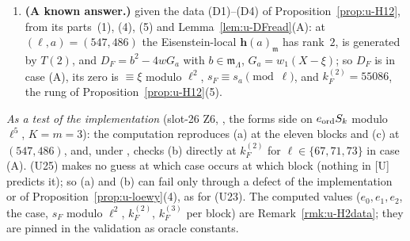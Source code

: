 \documentclass[11pt]{article}
\newcommand{\Iw}{\Lambda}                         %
\newcommand{\hcusp}{\mathbf{h}}                   %
\begin{document}
\begin{prediction}
\begin{enumerate}
  ramified discrete valuation ring.
\item[(c)] \textbf{(A known answer.)} \PROVED{} given the data (D1)--(D4) of Proposition~\ref{prop:u-H12}, from its
parts~(1), (4), (5) and Lemma~\ref{lem:u-DFread}(A): at $(\ell,a)=(547,486)$ the Eisenstein-local
  $\hcusp(a)_{\mathfrak m}$ has rank~$2$, is generated by $T(2)$, and $D_F=b^{2}-4wG_a$ with $b\in\mathfrak m_\Iw$, $G_a=w_1(X-\xi)$; so $D_F$ is in case (A), its zero is $\equiv\xi$
  modulo $\ell^{2}$, $s_F\equiv s_a\pmod\ell$, and $k^{(2)}_F=55086$, the rung of Proposition~\ref{prop:u-H12}(5).
\end{enumerate}
\emph{As a test of the implementation} (slot-26 Z6, , the forms side on $e_{\mathrm{ord}} S_k$ modulo $\ell^{5}$, $K=m=3$):
the computation reproduces (a) at the eleven blocks and (c) at $(547,486)$, and, under , checks (b) directly at $k^{(2)}_F$ for $\ell\in\{67,71,73\}$ in case (A).
(U25) makes no guess at which case occurs at which block (nothing in [U] predicts it); so (a) and (b) can fail only through a defect of the implementation or of
Proposition~\ref{prop:u-loewy}(4), as for (U23).
The computed values ($e_0,e_1,e_2$, the case, $s_F$ modulo $\ell^{2}$, $k^{(2)}_F$, $k^{(3)}_F$ per block) are Remark~\ref{rmk:u-H2data}; they are pinned
in the validation as oracle constants.
\end{prediction}
\end{document}
